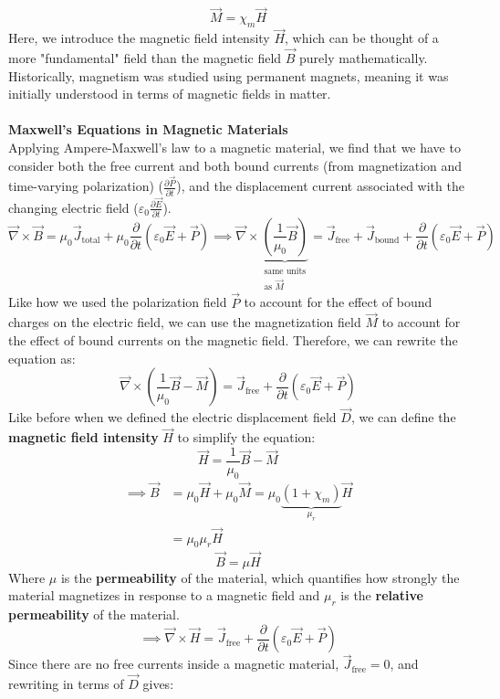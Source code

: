 \documentclass[12pt]{article}
\begin{document}
\[\boxed{\vec{M} = \chi_m \vec{H}}\]
Here, we introduce the magnetic field intensity $\vec{H}$, which can be thought of a more "fundamental" field than the magnetic field $\vec{B}$ purely mathematically. Historically, magnetism was studied using permanent magnets, meaning it was initially understood in terms of magnetic fields in matter.\\\\
\textbf{Maxwell's Equations in Magnetic Materials}\\
Applying Ampere-Maxwell's law to a magnetic material, we find that we have to consider both the free current and both bound currents (from magnetization and time-varying polarization) ($\frac{\partial \vec{P}}{\partial t}$), and the displacement current associated with the changing electric field ($\varepsilon_0\frac{\partial \vec{E}}{\partial t}$).
\[\vec{\nabla}\times\vec{B} = \mu_0 \vec{J}_\text{total} + \mu_0 \frac{\partial}{\partial t}(\varepsilon_0\vec{E}+\vec{P}) \implies \vec{\nabla}\times\underbrace{\left(\frac{1}{\mu_0}\vec{B}\right)}_{\substack{\text{same units} \\ \text{as }\vec{M}}} = \vec{J}_\text{free} + \vec{J}_\text{bound} + \frac{\partial}{\partial t}(\varepsilon_0\vec{E}+\vec{P})\]
Like how we used the polarization field $\vec{P}$ to account for the effect of bound charges on the electric field, we can use the magnetization field $\vec{M}$ to account for the effect of bound currents on the magnetic field. Therefore, we can rewrite the equation as:
\[\vec{\nabla}\times\left(\frac{1}{\mu_0}\vec{B} - \vec{M}\right) = \vec{J}_\text{free} + \frac{\partial}{\partial t}(\varepsilon_0\vec{E}+\vec{P})\]
Like before when we defined the electric displacement field $\vec{D}$, we can define the \textbf{magnetic field intensity} $\vec{H}$ to simplify the equation:
\[\vec{H} = \frac{1}{\mu_0}\vec{B} - \vec{M}\]
\[\begin{aligned}
    \implies \vec{B} &= \mu_0\vec{H} + \mu_0\vec{M} = \mu_0\underbrace{(1 + \chi_m)}_{\mu_r}\vec{H}\\
    &=\mu_0 \mu_r \vec{H}
\end{aligned}\]
\[\boxed{\vec{B}=\mu\vec{H}}\]
Where $\mu$ is the \textbf{permeability} of the material, which quantifies how strongly the material magnetizes in response to a magnetic field and $\mu_r$ is the \textbf{relative permeability} of the material.
\[\implies \vec{\nabla}\times\vec{H} = \vec{J}_\text{free} + \frac{\partial}{\partial t}(\varepsilon_0\vec{E}+\vec{P})\]
Since there are no free currents inside a magnetic material, $\vec{J}_\text{free} = 0$, and rewriting in terms of $\vec{D}$ gives:
\end{document}
